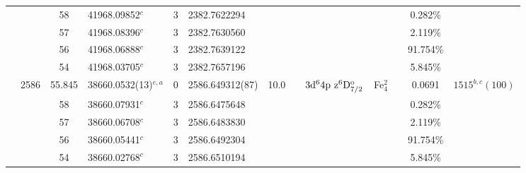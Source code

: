 \begin{table*}
\begin{center}
{\begin{tabular}{:l;l;c;l;c;l;c;l;l;c;c;c;c}
\rowstyle{\itshape}               &        & 58        & 41968.09852$^{c}$                & 3 &  2382.7622294      &      & $                                        $ & $                                        $ &             &              & 0.282\%   & $     ^{}     $\\
\rowstyle{\itshape}               &        & 57        & 41968.08396$^{c}$                & 3 &  2382.7630560      &      & $                                        $ & $                                        $ &             &              & 2.119\%   & $     ^{}     $\\
\rowstyle{\itshape}               &        & 56        & 41968.06888$^{c}$                & 3 &  2382.7639122      &      & $                                        $ & $                                        $ &             &              & 91.754\%  & $     ^{}     $\\
\rowstyle{\itshape}               &        & 54        & 41968.03705$^{c}$                & 3 &  2382.7657196      &      & $                                        $ & $                                        $ &             &              & 5.845\%   & $     ^{}     $\\
                                  & 2586   & 55.845    & 38660.0532(13)$^{e,a}$           & 0 &   2586.649312(87)  & 10.0 & $                                        $ & $3\rm{d}^64\rm{p~z}^6\rm{D}_{7/2}^{\rm o}$ & Fe$^2_{4}$  &              & 0.0691    & $ 1515^{b,c}(100)$\\
\rowstyle{\itshape}               &        & 58        & 38660.07931$^{c}$                & 3 &  2586.6475648      &      & $                                        $ & $                                        $ &             &              & 0.282\%   & $     ^{}     $\\
\rowstyle{\itshape}               &        & 57        & 38660.06708$^{c}$                & 3 &  2586.6483830      &      & $                                        $ & $                                        $ &             &              & 2.119\%   & $     ^{}     $\\
\rowstyle{\itshape}               &        & 56        & 38660.05441$^{c}$                & 3 &  2586.6492304      &      & $                                        $ & $                                        $ &             &              & 91.754\%  & $     ^{}     $\\
\rowstyle{\itshape}               &        & 54        & 38660.02768$^{c}$                & 3 &  2586.6510194      &      & $                                        $ & $                                        $ &             &              & 5.845\%   & $     ^{}     $\\

\end{tabular}}
\end{center}
\end{table*}
